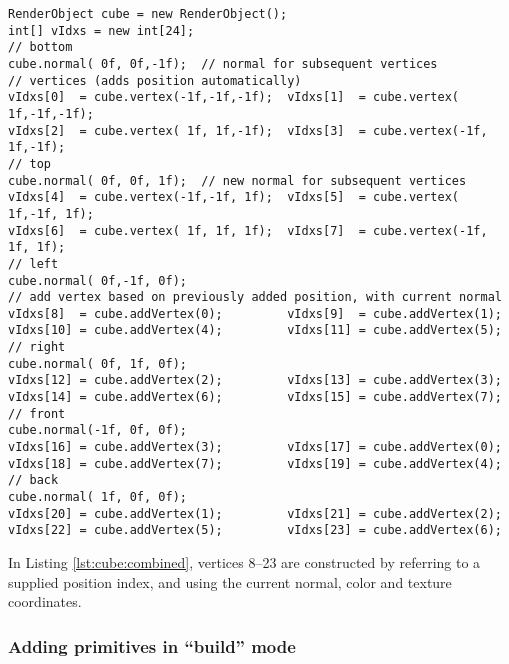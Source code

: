 \documentclass{article}
\begin{document}
\begin{lstlisting}[caption={Combining vertex construction methods},label=lst:cube:combined]
RenderObject cube = new RenderObject();
int[] vIdxs = new int[24];
// bottom
cube.normal( 0f, 0f,-1f);  // normal for subsequent vertices
// vertices (adds position automatically)
vIdxs[0]  = cube.vertex(-1f,-1f,-1f);  vIdxs[1]  = cube.vertex( 1f,-1f,-1f);
vIdxs[2]  = cube.vertex( 1f, 1f,-1f);  vIdxs[3]  = cube.vertex(-1f, 1f,-1f);
// top
cube.normal( 0f, 0f, 1f);  // new normal for subsequent vertices
vIdxs[4]  = cube.vertex(-1f,-1f, 1f);  vIdxs[5]  = cube.vertex( 1f,-1f, 1f);
vIdxs[6]  = cube.vertex( 1f, 1f, 1f);  vIdxs[7]  = cube.vertex(-1f, 1f, 1f);
// left
cube.normal( 0f,-1f, 0f);
// add vertex based on previously added position, with current normal
vIdxs[8]  = cube.addVertex(0);         vIdxs[9]  = cube.addVertex(1);
vIdxs[10] = cube.addVertex(4);         vIdxs[11] = cube.addVertex(5);
// right
cube.normal( 0f, 1f, 0f);
vIdxs[12] = cube.addVertex(2);         vIdxs[13] = cube.addVertex(3);
vIdxs[14] = cube.addVertex(6);         vIdxs[15] = cube.addVertex(7);
// front
cube.normal(-1f, 0f, 0f);
vIdxs[16] = cube.addVertex(3);         vIdxs[17] = cube.addVertex(0);
vIdxs[18] = cube.addVertex(7);         vIdxs[19] = cube.addVertex(4);
// back
cube.normal( 1f, 0f, 0f);
vIdxs[20] = cube.addVertex(1);         vIdxs[21] = cube.addVertex(2);
vIdxs[22] = cube.addVertex(5);         vIdxs[23] = cube.addVertex(6);
\end{lstlisting}
In Listing \ref{lst:cube:combined}, vertices 8--23 are constructed by referring to a supplied
position index, and using the current normal, color and texture coordinates.

\subsubsection{Adding primitives in ``build'' mode}
\end{document}
